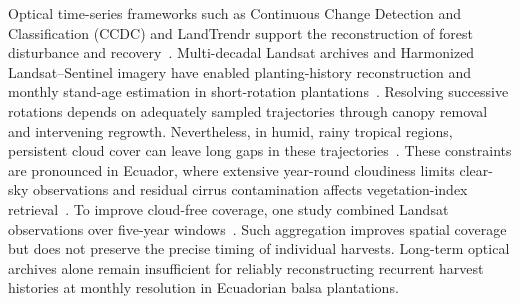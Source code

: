 Optical time-series frameworks such as Continuous Change Detection and Classification (CCDC) and LandTrendr support the reconstruction of forest disturbance and recovery~\citep{Kennedy2010LandTrendr,Zhu2014CCDC}. Multi-decadal Landsat archives and Harmonized Landsat--Sentinel imagery have enabled planting-history reconstruction and monthly stand-age estimation in short-rotation plantations~\citep{Li2022EucalyptusHistory,Huang2026EucalyptusAge}. Resolving successive rotations depends on adequately sampled trajectories through canopy removal and intervening regrowth. Nevertheless, in humid, rainy tropical regions, persistent cloud cover can leave long gaps in these trajectories~\citep{FloresAnderson2023TropicalCloudFreeOptical}. These constraints are pronounced in Ecuador, where extensive year-round cloudiness limits clear-sky observations and residual cirrus contamination affects vegetation-index retrieval~\citep{OchoaBrito2023EcuadorCropland,AlvarezMendoza2019CirrusEcuador}. To improve cloud-free coverage, one study combined Landsat observations over five-year windows~\citep{OchoaBrito2023EcuadorCropland}. Such aggregation improves spatial coverage but does not preserve the precise timing of individual harvests. Long-term optical archives alone remain insufficient for reliably reconstructing recurrent harvest histories at monthly resolution in Ecuadorian balsa plantations.




